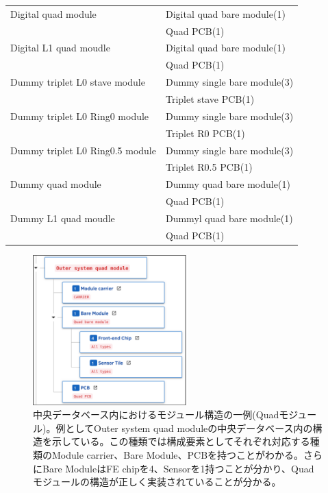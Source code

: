 \begin{table}[btp]
\begin{center}
\begin{tabular}{|ll|}
    Digital quad module       &  Digital quad bare module(1) \\
                              &  Quad PCB(1) \\\hline
    Digital L1 quad moudle    &  Digital quad bare module(1) \\
                              &  Quad PCB(1) \\\hline
    Dummy triplet L0 stave module   &  Dummy single bare module(3) \\
                                    &  Triplet stave PCB(1) \\\hline
    Dummy triplet L0 Ring0 module   &  Dummy single bare module(3) \\
                                    &  Triplet R0 PCB(1) \\\hline
    Dummy triplet L0 Ring0.5 module &  Dummy single bare module(3) \\
                                    &  Triplet R0.5 PCB(1) \\\hline
    Dummy quad module       &  Dummy quad bare module(1) \\
                            &  Quad PCB(1) \\\hline
    Dummy L1 quad moudle    &  Dummyl quad bare module(1) \\
                            &  Quad PCB(1) \\ \hline
  \end{tabular}
\end{center}
\end{table}

\begin{figure}[bpt]\centering
\includegraphics[width=6cm]{example_module_structure}
\caption[中央データベース内におけるモジュール構造の一例(Quadモジュール)]{中央データベース内におけるモジュール構造の一例(Quadモジュール)。例としてOuter system quad moduleの中央データベース内の構造を示している。この種類では構成要素としてそれぞれ対応する種類のModule carrier、Bare Module、PCBを持つことがわかる。さらにBare ModuleはFE chipを4、Sensorを1持つことが分かり、Quadモジュールの構造が正しく実装されていることが分かる。}
\label{example_module_structure}
\end{figure}

